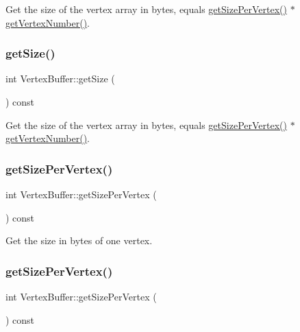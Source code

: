 Get the size of the vertex array in bytes, equals \hyperlink{classVertexBuffer_abb3634042a6888dd732489bf7c25d275}{get\+Size\+Per\+Vertex()} $\ast$ \hyperlink{classVertexBuffer_a0146774ed7a06bcf70ba2647ba18f51b}{get\+Vertex\+Number()}. \mbox{\label{classVertexBuffer_a75077b81d0067d0255a48fe608370eb8}} 
\subsubsection{\texorpdfstring{get\+Size()}{getSize()}\hspace{0.1cm}{\footnotesize\ttfamily [2/2]}}
{\footnotesize\ttfamily int Vertex\+Buffer\+::get\+Size (\begin{DoxyParamCaption}{ }\end{DoxyParamCaption}) const}

Get the size of the vertex array in bytes, equals \hyperlink{classVertexBuffer_abb3634042a6888dd732489bf7c25d275}{get\+Size\+Per\+Vertex()} $\ast$ \hyperlink{classVertexBuffer_a0146774ed7a06bcf70ba2647ba18f51b}{get\+Vertex\+Number()}. \mbox{\label{classVertexBuffer_abb3634042a6888dd732489bf7c25d275}} 
\subsubsection{\texorpdfstring{get\+Size\+Per\+Vertex()}{getSizePerVertex()}\hspace{0.1cm}{\footnotesize\ttfamily [1/2]}}
{\footnotesize\ttfamily int Vertex\+Buffer\+::get\+Size\+Per\+Vertex (\begin{DoxyParamCaption}{ }\end{DoxyParamCaption}) const}

Get the size in bytes of one vertex. \mbox{\label{classVertexBuffer_abb3634042a6888dd732489bf7c25d275}} 
\subsubsection{\texorpdfstring{get\+Size\+Per\+Vertex()}{getSizePerVertex()}\hspace{0.1cm}{\footnotesize\ttfamily [2/2]}}
{\footnotesize\ttfamily int Vertex\+Buffer\+::get\+Size\+Per\+Vertex (\begin{DoxyParamCaption}{ }\end{DoxyParamCaption}) const}

